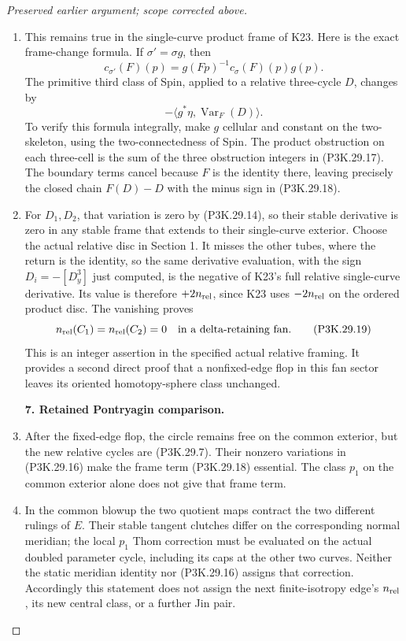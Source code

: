 \begin{proof}[Preserved earlier argument; scope corrected above]
\begin{enumerate}[label=\arabic*.]
\item This remains true in the single-curve product frame of
K23. Here is the exact frame-change formula. If
\(\sigma'=\sigma g\), then
\[
       c_{\sigma'}(F)(p)=
       g(Fp)^{-1}c_\sigma(F)(p)g(p).
                                                        \tag{P3K.29.17}
\]
The primitive third class of Spin, applied to a relative
three-cycle \(D\), changes by
\[
              -\langle g^*\eta,\operatorname{Var}_F(D)\rangle.
                                                        \tag{P3K.29.18}
\]
To verify this formula integrally, make \(g\) cellular and
constant on the two-skeleton, using the two-connectedness
of Spin. The product obstruction on each three-cell is
the sum of the three obstruction integers in
(P3K.29.17). The boundary terms cancel because \(F\) is
the identity there, leaving precisely the closed chain
\(F(D)-D\) with the minus sign in (P3K.29.18).

\item For \(D_1,D_2\), that variation is zero by
(P3K.29.14), so their stable derivative is zero in any
stable frame that extends to their single-curve exterior.
Choose the actual relative disc in Section 1. It misses
the other tubes, where the return is the identity, so the
same derivative evaluation, with the sign \(D_i=-[D^3_y]\)
just computed, is the negative of K23's full relative
single-curve derivative. Its value is therefore
\(+2n_{\rm rel}\), since K23 uses \(-2n_{\rm rel}\) on
the ordered product disc. The vanishing proves
\[
         n_{\rm rel}(C_1)=n_{\rm rel}(C_2)=0
             \quad\hbox{in a delta-retaining fan}.
                                                        \tag{P3K.29.19}
\]
This is an integer assertion in the specified actual
relative framing. It provides a second direct proof that
a nonfixed-edge flop in this fan sector leaves its
oriented homotopy-sphere class unchanged.

\par\medskip\noindent\textbf{7. Retained Pontryagin comparison.}\enspace

\item After the fixed-edge flop, the circle remains free on the
common exterior, but the new relative cycles are
(P3K.29.7). Their nonzero variations in
(P3K.29.16) make the frame term (P3K.29.18) essential.
The class \(p_1\) on the common exterior alone does not
give that frame term.

\item In the common blowup the two quotient maps contract the
two different rulings of \(E\). Their stable tangent
clutches differ on the corresponding normal meridian;
the local \(p_1\) Thom correction must be evaluated on
the actual doubled parameter cycle, including its
caps at the other two curves. Neither the static
meridian identity nor (P3K.29.16) assigns that correction.
Accordingly this statement does not assign the next
finite-isotropy edge's \(n_{\rm rel}\), its new central
class, or a further Jin pair.


\end{enumerate}
\end{proof}
